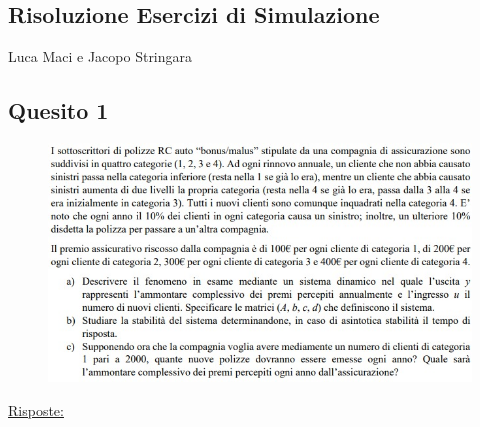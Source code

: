 \documentclass[a4paper]{report}
\begin{document}
\begin{center}

\section*{Risoluzione Esercizi di Simulazione}
Luca Maci e Jacopo Stringara
\end{center}
\subsection*{Quesito 1}
\begin{figure}[h]
\includegraphics[width=\textwidth]{prima_domanda}
\end{figure}
\underline{Risposte:}
\end{document}
